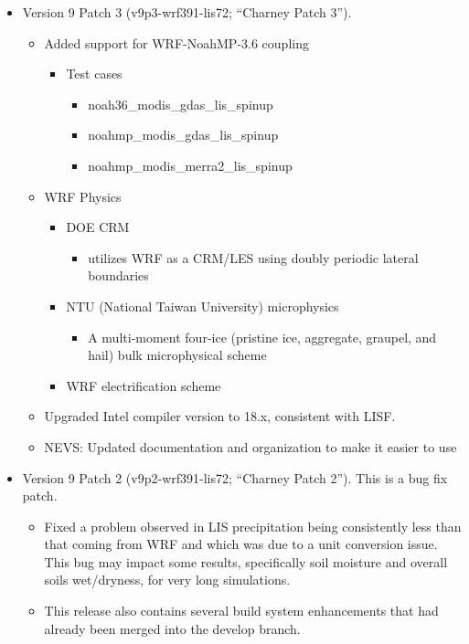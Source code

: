 \begin{itemize}
\item Version 9 Patch 3 (v9p3-wrf391-lis72; ``Charney Patch 3''). 
  \begin{itemize}
    \item Added support for WRF-NoahMP-3.6 coupling
    \begin{itemize}
         \item Test cases
         \begin{itemize}
              \item noah36\_modis\_gdas\_lis\_spinup
               \item noahmp\_modis\_gdas\_lis\_spinup
               \item noahmp\_modis\_merra2\_lis\_spinup
           \end{itemize}
        \end{itemize}
  \end{itemize}
  
    \begin{itemize}
    \item WRF Physics
    \begin{itemize}
	\item DOE CRM
         \begin{itemize}
               \item utilizes WRF as a CRM/LES using doubly periodic lateral boundaries
           \end{itemize}
         \item NTU (National Taiwan University) microphysics
         \begin{itemize}
               \item A multi-moment four-ice (pristine ice, aggregate, graupel, and hail) bulk microphysical scheme
           \end{itemize}
         \item WRF electrification scheme
        \end{itemize}
   \item Upgraded Intel compiler version to 18.x, consistent with LISF.
   \item NEVS: Updated documentation and organization to make it easier to use

  \end{itemize}

\end{itemize}

\begin{itemize}
\item Version 9 Patch 2 (v9p2-wrf391-lis72; ``Charney Patch 2''). This is a bug fix patch.
  \begin{itemize}
    \item Fixed a problem observed in LIS precipitation being consistently less than that coming from WRF 
    and which was due to a unit conversion issue. This bug may impact some results, specifically soil moisture 
    and overall soils wet/dryness, for very long simulations.
    \item This release also contains several build system enhancements that had already been merged 
    into the develop branch.
  \end{itemize}
\end{itemize}

